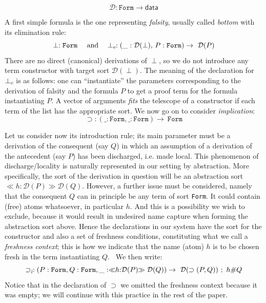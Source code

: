 \documentclass[11pt,a4paper]{amsart}
\newcounter{s}
\newcommand{\dabsort}[3]{\ensuremath{\ll\!\!\ntyping{#1}{#2}\!\!\gg #3}}
\newcommand{\depconstrdecl}[3]{\ensuremath{#1 : (#2) \rightarrow\ #3}}
\newcommand{\typing}[2]{\ensuremath{#1 : #2}}
\newcommand{\ntyping}[2]{\ensuremath{#1{:}#2}}
\newcommand{\fresh}[2]{#1 \# #2}
\newcommand{\data}{\ensuremath{\mathsf{data}}}
\newcommand{\fconstrdecl}[4]{\ensuremath{#1 : #2 \rightarrow\ #3\ ;\ #4}}
\newcommand{\cnst}[1]{\textsl{#1}}
\newcommand{\form}{\texttt{Form}}
\newcommand{\prf}{\ensuremath{\mathcal{D}}}
\newcommand{\impl}{\ensuremath{\supset}}
\newcommand{\Frm}{\texttt{Form}}
\begin{document}
\[
\prf: \Frm \to \data
\]

\noindent A first simple formula is the one representing \emph{falsity},
usually called \emph{bottom} with its elimination rule:
\[ \typing{\perp}{\form} \quad \text{ and } \ \ \depconstrdecl{\perp_{\cnst{e}}}{\typing{\_}{\prf(\perp)},\,\typing{P}{\form}}{\prf(P)}\]
\noindent There are no direct (canonical) derivations of $\perp$, so
we do not introduce any term constructor with target sort $\prf(\perp)$.
The meaning of the declaration for $\perp_{\cnst{e}}$ is as follows: one can 
``instantiate'' the parameters corresponding to the derivation of falsity and 
the formula $P$ to get a proof term for the formula instantiating $P$. 
A vector of arguments \emph{fits} the telescope of a constructor if 
each term of the list has the appropriate sort. 
We now go on to consider \emph{implication}:
\[\depconstrdecl{\impl}{\typing{\_}{\form}, \typing{\_}{\form}}{\form}\]

\noindent Let us consider now its introduction rule; its main parameter must be a
derivation of the consequent (say $Q$) in which an assumption of a derivation of the 
antecedent (say $P$) has been discharged, i.e. made local.
This phenomenon of discharge/locality is naturally represented in our setting by abstraction. More specifically, the sort of the derivation in question will be
an abstraction sort \dabsort{h}{\prf(P)}{\prf(Q)}.
%
However, a further issue must be considered, namely that the consequent $Q$
can in principle be any term of sort \form. It could contain (free) atoms
whatsoever, in particular $h$. And this is a possibility we wish to exclude,
because it would result in undesired name capture when forming the abstraction
sort above. Hence the declarations in our system have the sort for the
constructor and also a set of freshness conditions, constituting what we call a \emph{freshness context}; this is how we indicate that 
the name (atom) $h$ is to be chosen fresh in the term instantiating $Q$.  
\ We then write:
\[
\fconstrdecl{\impl_{\cnst{i}}}{(\typing{P}{\form}, \typing{Q}{\form},
    \typing{\_}{\dabsort{h}{\prf(P)}{\prf(Q}))}}{\prf(\impl(P,
    Q))}{\fresh{h}{Q}}
\]
Notice that in the declaration of $\impl$ we omitted the freshness context
because it was empty; we will continue with this practice in the rest of the paper.
\end{document}
